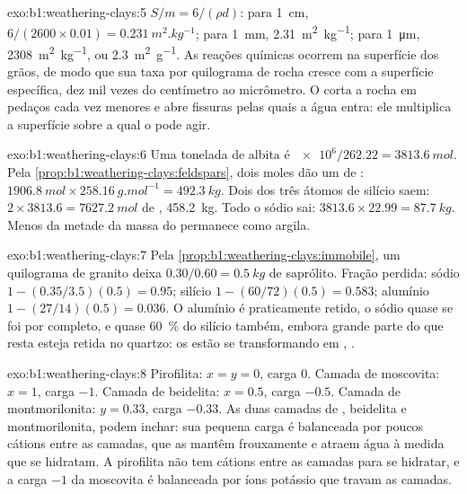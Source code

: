 \begin{solution}{exo:b1:weathering-clays:5}
$S/m = 6/(\rho d)$: para \qty{1}{cm}, $6/(2600\times0.01) =
\qty{0.231}{m^2.kg^{-1}}$; para \qty{1}{mm}, \qty{2.31}{m^2.kg^{-1}}; para
\qty{1}{\micro m}, \qty{2308}{m^2.kg^{-1}}, ou \qty{2.3}{m^2.g^{-1}}. As reações químicas ocorrem na superfície dos grãos, de modo que sua taxa por quilograma de rocha cresce com a superfície específica, dez mil vezes do centímetro ao micrômetro. O  corta a rocha em pedaços cada vez menores e abre fissuras pelas quais a água entra: ele multiplica a superfície sobre a qual o  pode agir.
\end{solution}

\begin{solution}{exo:b1:weathering-clays:6}
Uma tonelada de albita é $\num{e6}/262.22 = \qty{3813.6}{mol}$. Pela
\cref{prop:b1:weathering-clays:feldspars}, dois moles dão um de :
$\qty{1906.8}{mol} \times \qty{258.16}{g.mol^{-1}} = \qty{492.3}{kg}$. Dois dos três átomos de silício saem: $2\times3813.6 = \qty{7627.2}{mol}$ de
, \qty{458.2}{kg}. Todo o sódio sai: $3813.6\times22.99 =
\qty{87.7}{kg}$. Menos da metade da massa do  permanece como argila.
\end{solution}

\begin{solution}{exo:b1:weathering-clays:7}
Pela \cref{prop:b1:weathering-clays:immobile}, um quilograma de granito deixa
$0.30/0.60 = \qty{0.5}{kg}$ de saprólito. Fração perdida: sódio $1 -
(0.35/3.5)(0.5) = 0.95$; silício $1 - (60/72)(0.5) = 0.583$; alumínio $1 -
(27/14)(0.5) = 0.036$. O alumínio é praticamente retido, o sódio quase se foi por completo, e quase \qty{60}{\percent} do silício também, embora grande parte do que resta esteja retida no quartzo: os  estão se transformando em , .
\end{solution}

\begin{solution}{exo:b1:weathering-clays:8}
Pirofilita: $x = y = 0$, carga 0. Camada de moscovita: $x = 1$, carga $-1$.
Camada de beidelita: $x = 0.5$, carga $-0.5$. Camada de montmorilonita: $y = 0.33$,
carga $-0.33$. As duas camadas de , beidelita e montmorilonita, podem inchar: sua pequena carga é balanceada por poucos cátions entre as camadas, que as mantêm frouxamente e atraem água à medida que se hidratam. A pirofilita não tem cátions entre as camadas para se hidratar, e a carga $-1$ da moscovita é balanceada por íons potássio que travam as camadas.
\end{solution}

